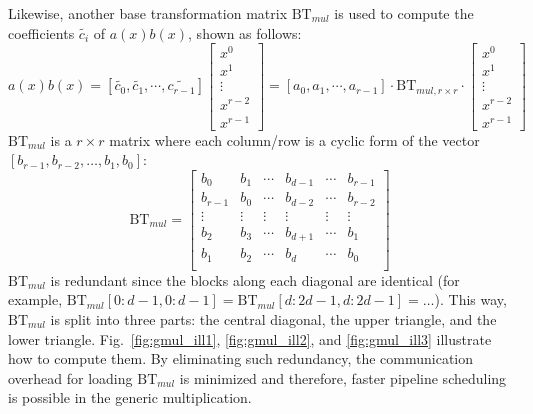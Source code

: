 \documentclass[runningheads]{llncs}
\begin{document}
Likewise, another base transformation matrix $\text{BT}_{mul}$ is used to compute the coefficients $\widetilde{c_{i}}$ of $a(x)b(x)$, shown as follows:
\[
a(x)b(x)= [\widetilde{c_{0}},\widetilde{c_{1}},\cdots,\widetilde{c_{r-1}}]\left[ \begin{array}{c}
x^{0} \\
x^{1} \\
\vdots\\
x^{r-2}\\
x^{r-1}
\end{array}
\right ]
=
[{a_{0}},{a_{1}},\cdots,{a_{r-1}}]
\cdot \text{BT}_{mul,r\times r} \cdot
\left[ \begin{array}{c}
x^{0} \\
x^{1} \\
\vdots\\
x^{r-2}\\
x^{r-1}
\end{array}
\right ]
\]
$\text{BT}_{mul}$ is a $r\times r$ matrix where each column/row is a cyclic form of the vector $[b_{r-1},b_{r-2},\ldots, b_{1},b_{0}]$:
\[
\text{BT}_{mul} =
\left[ \begin{array}{cccccc}
b_{0}&b_{1}&\cdots&b_{d-1}&\cdots &b_{r-1} \\
b_{r-1}&b_{0}&\cdots&b_{d-2}&\cdots &b_{r-2} \\
\vdots&\vdots&\vdots&\vdots&\vdots&\vdots\\
b_{2}&b_{3}&\cdots&b_{d+1}&\cdots &b_{1} \\
b_{1}&b_{2}&\cdots&b_{d}&\cdots &b_{0} \\
\end{array}
\right ]
\]
$\text{BT}_{mul}$ is redundant since the blocks along each diagonal are identical (for example, $\text{BT}_{mul}[0:d-1,0:d-1] = \text{BT}_{mul}[d:2d-1,d:2d-1] = \ldots$). This way, $\text{BT}_{mul}$ is split into three parts: the central diagonal, the upper triangle, and the lower triangle. Fig.~\ref{fig:gmul_ill1}, \ref{fig:gmul_ill2}, and \ref{fig:gmul_ill3} illustrate how to compute them. By eliminating such redundancy, the communication overhead for loading $\text{BT}_{mul}$ is minimized and therefore, faster pipeline scheduling is possible in the generic multiplication.
\end{document}
